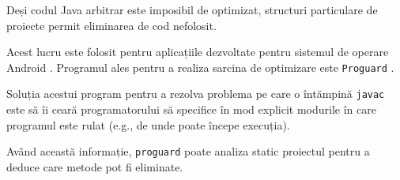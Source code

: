 Deși codul Java arbitrar este imposibil de optimizat, structuri
particulare de proiecte permit eliminarea de cod nefolosit.

Acest lucru este folosit pentru aplicațiile dezvoltate pentru
sistemul de operare Android \cite{proguard_google}.
Programul ales pentru a realiza sarcina de optimizare este
\texttt{Proguard} \cite{proguard}.

Soluția acestui program pentru a rezolva problema pe care o
întămpină \texttt{javac} este să îi ceară programatorului să
specifice în mod explicit modurile în care programul este rulat
(e.g., de unde poate începe execuția).

Având această informație, \texttt{proguard} poate analiza static
proiectul pentru a deduce care metode pot fi eliminate.
